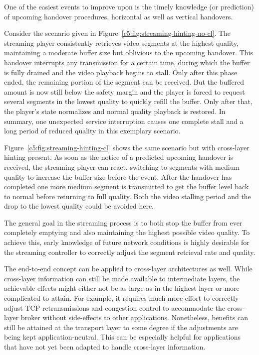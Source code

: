 One of the easiest events to improve upon is the timely knowledge (or prediction) of upcoming handover procedures, horizontal as well as vertical handovers.

Consider the scenario given in Figure~\ref{c5:fig:streaming-hinting-no-cl}. The streaming player consistently retrieves video segments at the highest quality, maintaining a moderate buffer size but oblivious to the upcoming handover. This handover interrupts any transmission for a certain time, during which the buffer is fully drained and the video playback begins to stall. Only after this phase ended, the remaining portion of the segment can be received. But the buffered amount is now still below the safety margin and the player is forced to request several segments in the lowest quality to quickly refill the buffer. Only after that, the player's state normalizes and normal quality playback is restored. In summary, one unexpected service interruption causes one complete stall and a long period of reduced quality in this exemplary scenario.

Figure~\ref{c5:fig:streaming-hinting-cl} shows the same scenario but with cross-layer hinting present. As soon as the notice of a predicted upcoming handover is received, the streaming player can react, switching to segments with medium quality to increase the buffer size before the event. After the handover has completed one more medium segment is transmitted to get the buffer level back to normal before returning to full quality. Both the video stalling period and the drop to the lowest quality could be avoided here.

The general goal in the streaming process is to both stop the buffer from ever completely emptying and also maintaining the highest possible video quality. To achieve this, early knowledge of future network conditions is highly desirable for the streaming controller to correctly adjust the segment retrieval rate and quality.

The end-to-end concept can be applied to cross-layer architectures as well. While cross-layer information can still be made available to intermediate layers, the achievable effects might either not be as large as in the highest layer or more complicated to attain. For example, it requires much more effort to correctly adjust \gls{TCP} retransmissions and congestion control to accommodate the cross-layer broker without side-effects to other applications. Nonetheless, benefits can still be attained at the transport layer to some degree if the adjustments are being kept application-neutral. This can be especially helpful for applications that have not yet been adapted to handle cross-layer information.


